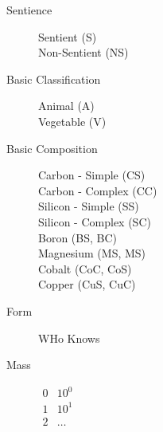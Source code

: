 \begin{description}

	\item[Sentience]
	\begin{description}
		\item[Sentient (S)] 
		\item[Non-Sentient (NS)]
	\end{description}

	\item[Basic Classification]
	\begin{description}
		\item[Animal (A)]
		\item[Vegetable (V)]
	\end{description}

	\item[Basic Composition]
    \begin{description}
		\item[Carbon - Simple (CS)]
		\item[Carbon - Complex (CC)]
		\item[Silicon - Simple (SS)]
		\item[Silicon - Complex (SC)]
		\item[Boron (BS, BC)]
		\item[Magnesium (MS, MS)]
		\item[Cobalt (CoC, CoS)]
		\item[Copper (CuS, CuC)]
	\end{description}

	\item[Form]
        WHo Knows

	\item[Mass]
    	\(
    	\begin{array}{ll}
		0		& 10^{0}  \\
		1		& 10^{1}  \\
		2		& \dots 
		\end{array}
        \)


\end{description}
